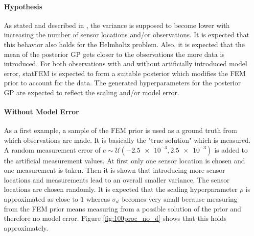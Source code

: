 \documentclass[%
  a4paper,oneside,%
  11pt,%
  smallchapters,
  style=printdev,
  extramargin,
  green,%
  rgb, <cmyk>
  ]{tubsbook}
\begin{document}
\paragraph{Hypothesis}
As stated and described in \cite{rasmussen2006}, the variance is supposed to become lower with increasing the number of sensor locations and/or observations. It is expected that this behavior also holds for the Helmholtz problem. Also, it is expected that the mean of the posterior GP gets closer to the observations the more data is introduced. For both observations with and without artificially introduced model error, statFEM is expected to form a suitable posterior which modifies the FEM prior to account for the data. The generated hyperparameters for the posterior GP are expected to reflect the scaling and/or model error.


\paragraph{Without Model Error}
As a first example, a sample of the FEM prior is used as a ground truth from which observations are made. It is basically the "true solution" which is measured. A random measurement error of $e \sim \mathcal{U}(\num{-2.5e-3}, \num{2.5e-3})$ is added to the artificial measurement values. At first only one sensor location is chosen and one measurement is taken. Then it is shown that introducing more sensor locations and measurements lead to an overall smaller variance. The sensor locations are chosen randomly. It is expected that the scaling hyperparameter $\rho$ is approximated as close to $1$ whereas $\sigma_d$ becomes very small because measuring from the FEM prior means measuring from a possible solution of the prior and therefore no model error. Figure \ref{fig:100proc_no_d} shows that this holds approximately. %
\end{document}
